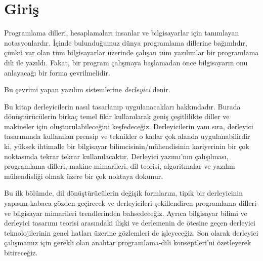 \pagestyle{myheadings}
\renewcommand{\chaptername}{Bölüm}

\chapter{Giriş}
Programlama dilleri, hesaplamaları insanlar ve bilgisayarlar için tanımlayan notasyonlardır. İçinde bulunduğumuz dünya programlama dillerine bağımlıdır, çünkü var olan tüm bilgisayarlar üzerinde çalışan tüm yazılımlar bir programlama dili ile yazıldı. Fakat, bir program çalışmaya başlamadan önce bilgisayarın onu anlayacağı bir forma çevrilmelidir.

Bu çevrimi yapan yazılım sistemlerine  \textit{derleyici} denir.

Bu kitap derleyicilerin nasıl tasarlanıp uygulanacakları hakkındadır. Burada dönüştürücülerin birkaç temel fikir kullanılarak geniş çeşitlilikte diller ve makineler için oluşturulabileceğini keşfedeceğiz. Derleyicilerin yanı sıra, derleyici tasarımında kullanılan prensip ve teknikler o kadar çok alanda uygulanabilirdir ki, yüksek ihtimalle bir bilgisayar bilimcisinin/mühendisinin kariyerinin bir çok noktasında tekrar tekrar kullanılacaktır. Derleyici yazımı'nın çalışılması, programlama dilleri, makine mimarileri, dil teorisi, algoritmalar ve yazılım mühendisliği olmak üzere bir çok noktaya dokunur.

Bu ilk bölümde, dil dönüştürücülerin değişik formlarını, tipik bir derleyicinin yapısını kabaca gözden geçirecek ve derleyicileri şekillendiren programlama dilleri ve bilgisayar mimarileri trendlerinden bahsedeceğiz. Ayrıca bilgisayar bilimi ve derleyici tasarımı teorisi arasındaki ilişki ve derlemenin de ötesine geçen derleyici teknolojilerinin genel hatları üzerine gözlemleri de işleyeceğiz. Son olarak derleyici çalışmamız için gerekli olan anahtar programlama-dili konseptleri'ni özetleyerek bitireceğiz.




